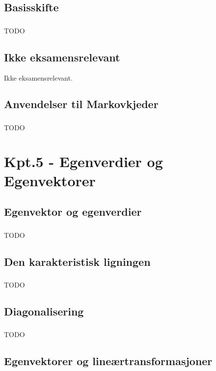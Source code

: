 \documentclass{article}
\begin{document}
    \subsection{Basisskifte}
      \subsubsection{}
        TODO
    \subsection{Ikke eksamensrelevant}
      Ikke eksamensrelevant.
    \subsection{Anvendelser til Markovkjeder}
      \subsubsection{}
        TODO
  \section{Kpt.5 - Egenverdier og Egenvektorer}
    \subsection{Egenvektor og egenverdier}
      \subsubsection{}
        TODO
    \subsection{Den karakteristisk ligningen}
      \subsubsection{}
        TODO
    \subsection{Diagonalisering}
      \subsubsection{}
        TODO
    \subsection{Egenvektorer og lineærtransformasjoner}
\end{document}
